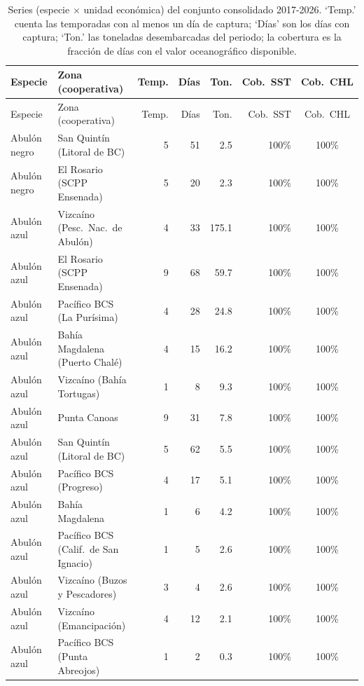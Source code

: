\begingroup\footnotesize\setlength{\tabcolsep}{3.5pt}
\begin{longtable}{llrrrrc}
\caption{Series (especie $\times$ unidad económica) del conjunto consolidado 2017-2026. `Temp.' cuenta las temporadas con al menos un día de captura; `Días' son los días con captura; `Ton.' las toneladas desembarcadas del periodo; la cobertura es la fracción de días con el valor oceanográfico disponible.}\label{tab:series_resumen}\\
\toprule
Especie & Zona (cooperativa) & Temp. & Días & Ton. & Cob.\ SST & Cob.\ CHL \\
\midrule
\endfirsthead
\toprule
Especie & Zona (cooperativa) & Temp. & Días & Ton. & Cob.\ SST & Cob.\ CHL \\
\midrule
\endhead
\bottomrule
\endfoot
Abulón negro & San Quintín (Litoral de BC) & 5 & 51 & 2.5 & 100\% & 100\% \\
Abulón negro & El Rosario (SCPP Ensenada) & 5 & 20 & 2.3 & 100\% & 100\% \\
Abulón azul & Vizcaíno (Pesc.\ Nac.\ de Abulón) & 4 & 33 & 175.1 & 100\% & 100\% \\
Abulón azul & El Rosario (SCPP Ensenada) & 9 & 68 & 59.7 & 100\% & 100\% \\
Abulón azul & Pacífico BCS (La Purísima) & 4 & 28 & 24.8 & 100\% & 100\% \\
Abulón azul & Bahía Magdalena (Puerto Chalé) & 4 & 15 & 16.2 & 100\% & 100\% \\
Abulón azul & Vizcaíno (Bahía Tortugas) & 1 & 8 & 9.3 & 100\% & 100\% \\
Abulón azul & Punta Canoas & 9 & 31 & 7.8 & 100\% & 100\% \\
Abulón azul & San Quintín (Litoral de BC) & 5 & 62 & 5.5 & 100\% & 100\% \\
Abulón azul & Pacífico BCS (Progreso) & 4 & 17 & 5.1 & 100\% & 100\% \\
Abulón azul & Bahía Magdalena & 1 & 6 & 4.2 & 100\% & 100\% \\
Abulón azul & Pacífico BCS (Calif.\ de San Ignacio) & 1 & 5 & 2.6 & 100\% & 100\% \\
Abulón azul & Vizcaíno (Buzos y Pescadores) & 3 & 4 & 2.6 & 100\% & 100\% \\
Abulón azul & Vizcaíno (Emancipación) & 4 & 12 & 2.1 & 100\% & 100\% \\
Abulón azul & Pacífico BCS (Punta Abreojos) & 1 & 2 & 0.3 & 100\% & 100\% \\

\end{longtable}

